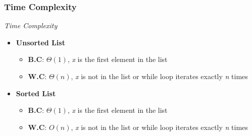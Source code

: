 \documentclass[10pt, 
a4paper, 
oneside, 
headinclude, footinclude, 
BCOR5mm]
{scrartcl}
\begin{document}
\subsubsection{Time Complexity}
\begin{definition}
    \textit{Time Complexity}
    \begin{itemize}
        \item \textbf{Unsorted List}
        \begin{itemize}
            \item \textbf{B.C}: $\Theta(1)$, \textit{x} is the first element in the list
            \item \textbf{W.C}: $\Theta(n)$, \textit{x} is not in the list or while loop iterates exactly \textit{n} times 
        \end{itemize}
        \item \textbf{Sorted List}
        \begin{itemize}
            \item \textbf{B.C}: $\Theta(1)$, \textit{x} is the first element in the list
            \item \textbf{W.C}: $O(n)$, \textit{x} is not in the list or while loop iterates exactly \textit{n} times
        \end{itemize}
    \end{itemize}
\end{definition}
\end{document}
